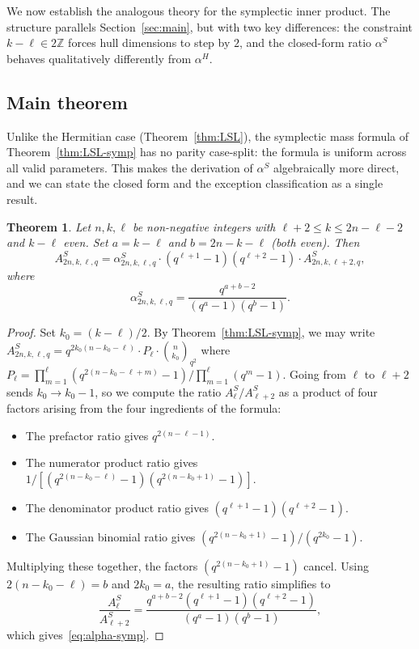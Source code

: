 \documentclass[11pt]{article}
\theoremstyle{plain}
\newtheorem{theorem}{Theorem}
\theoremstyle{remark}
\begin{document}
We now establish the analogous theory for the symplectic inner product.
The structure parallels Section~\ref{sec:main}, but with two key differences:
the constraint $k - \ell \in 2\mathbb{Z}$ forces hull dimensions to step by $2$, and
the closed-form ratio $\alpha^S$ behaves qualitatively differently from $\alpha^H$.

\subsection{Main theorem}\label{sec:Smain}

Unlike the Hermitian case (Theorem~\ref{thm:LSL}), the symplectic mass formula
of Theorem~\ref{thm:LSL-symp} has no parity case-split: the formula is uniform
across all valid parameters. This makes the derivation of $\alpha^S$
algebraically more direct, and we can state the closed form and the
exception classification as a single result.

\begin{theorem}\label{thm:main-symp}
Let $n, k, \ell$ be non-negative integers with $\ell + 2 \leq k \leq 2n - \ell - 2$
and $k - \ell$ even. Set $a = k - \ell$ and $b = 2n - k - \ell$ (both even). Then
\[
  A^S_{2n,k,\ell,q} = \alpha^S_{2n,k,\ell,q} \cdot (q^{\ell+1}-1)(q^{\ell+2}-1) \cdot A^S_{2n,k,\ell+2,q},
\]
where
\begin{equation}\label{eq:alpha-symp}
  \alpha^S_{2n,k,\ell,q} = \frac{q^{a+b-2}}{(q^{a}-1)(q^{b}-1)}.
\end{equation}
\end{theorem}

\begin{proof}
Set $k_0 = (k-\ell)/2$. By Theorem~\ref{thm:LSL-symp}, we may write
$A^S_{2n, k, \ell, q} = q^{2k_0(n-k_0-\ell)} \cdot P_\ell \cdot \binom{n}{k_0}_{q^2}$
where $P_\ell = \prod_{m=1}^{\ell}(q^{2(n-k_0-\ell+m)}-1) / \prod_{m=1}^{\ell}(q^m-1)$.
Going from $\ell$ to $\ell+2$ sends $k_0 \to k_0 - 1$, so we compute the ratio
$A^S_\ell / A^S_{\ell+2}$ as a product of four factors arising from the four
ingredients of the formula:
\begin{itemize}
\item The prefactor ratio gives $q^{2(n-\ell-1)}$.
\item The numerator product ratio gives $1 / [(q^{2(n-k_0-\ell)}-1)(q^{2(n-k_0+1)}-1)]$.
\item The denominator product ratio gives $(q^{\ell+1}-1)(q^{\ell+2}-1)$.
\item The Gaussian binomial ratio gives $(q^{2(n-k_0+1)}-1) / (q^{2k_0}-1)$.
\end{itemize}
Multiplying these together, the factors $(q^{2(n-k_0+1)}-1)$ cancel. Using
$2(n-k_0-\ell) = b$ and $2k_0 = a$, the resulting ratio simplifies to
\[
  \frac{A^S_\ell}{A^S_{\ell+2}} = \frac{q^{a+b-2} (q^{\ell+1}-1)(q^{\ell+2}-1)}{(q^a-1)(q^b-1)},
\]
which gives~\eqref{eq:alpha-symp}.
\end{proof}
\end{document}
